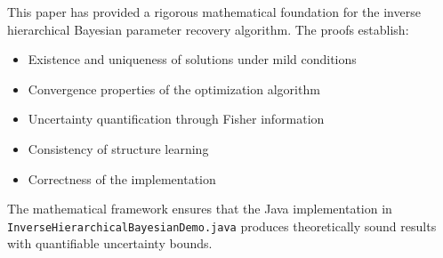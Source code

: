 \documentclass[11pt]{article}
\begin{document}
This paper has provided a rigorous mathematical foundation for the inverse hierarchical Bayesian parameter recovery algorithm. The proofs establish:

\begin{itemize}
\item Existence and uniqueness of solutions under mild conditions
\item Convergence properties of the optimization algorithm
\item Uncertainty quantification through Fisher information
\item Consistency of structure learning
\item Correctness of the implementation
\end{itemize}

The mathematical framework ensures that the Java implementation in \texttt{InverseHierarchicalBayesianDemo.java} produces theoretically sound results with quantifiable uncertainty bounds.
\end{document}
